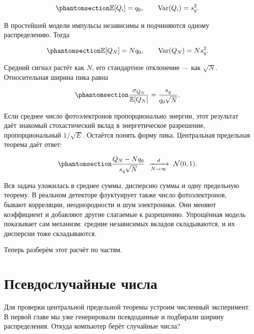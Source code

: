 \documentclass[
  russian,
  11pt,
  a4paper,
  open=any]{scrbook}
\begin{document}
\begin{equation}\protect\phantomsection\label{eq-single-photoelectron-moments}{
\mathbb E[Q_i]=q_0,
\qquad
\operatorname{Var}(Q_i)=s_q^2.
}\end{equation}

В простейшей модели импульсы независимы и подчиняются одному
распределению. Тогда

\begin{equation}\protect\phantomsection\label{eq-photodetector-charge-moments}{
\mathbb E[Q_N]=Nq_0,
\qquad
\operatorname{Var}(Q_N)=Ns_q^2.
}\end{equation}

Средний сигнал растёт как \(N\), его стандартное отклонение --- как
\(\sqrt N\). Относительная ширина пика равна

\begin{equation}\protect\phantomsection\label{eq-photodetector-relative-resolution}{
\frac{\sigma_{Q_N}}{\mathbb E[Q_N]}
=
\frac{s_q}{q_0\sqrt N}.
}\end{equation}

Если среднее число фотоэлектронов пропорционально энергии, этот
результат даёт знакомый стохастический вклад в энергетическое
разрешение, пропорциональный \(1/\sqrt E\). Остаётся понять форму пика.
Центральная предельная теорема даёт ответ:

\begin{equation}\protect\phantomsection\label{eq-photodetector-gaussian-limit}{
\frac{Q_N-Nq_0}{s_q\sqrt N}
\ \xrightarrow[N\to\infty]{d}\
\mathcal N(0,1).
}\end{equation}

Вся задача уложилась в среднее суммы, дисперсию суммы и одну предельную
теорему. В реальном детекторе флуктуирует также число фотоэлектронов,
бывают корреляции, неоднородности и шум электроники. Они меняют
коэффициент и добавляют другие слагаемые к разрешению. Упрощённая модель
показывает сам механизм: средние независимых вкладов складываются, и их
дисперсии тоже складываются.

Теперь разберём этот расчёт по частям.

\section{Псевдослучайные числа}\label{interactive-uniform-sample}

Для проверки центральной предельной теоремы устроим численный
эксперимент. В первой главе мы уже генерировали псевдоданные и подбирали
ширину распределения. Откуда компьютер берёт случайные числа?
\end{document}
